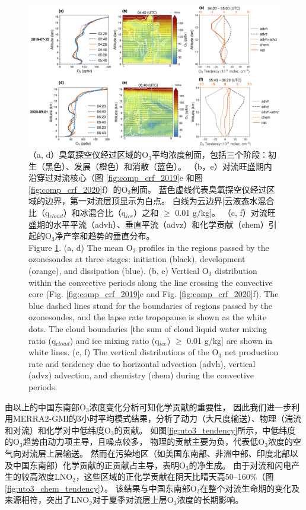 \begin{figure}[!htbp]
\centering
\includegraphics[width=\textwidth]{./figures/tendency_o3.png}
\caption{
（a, d）臭氧探空仪经过区域的O$_3$平均浓度剖面，包括三个阶段：初生（黑色）、发展（橙色）和消散（蓝色）。
（b，e）对流旺盛期内沿穿过对流核心（图 \ref{fig:comp_crf_2019}e 和图 \ref{fig:comp_crf_2020}f）的O$_3$剖面。
蓝色虚线代表臭氧探空仪经过区域的边界，第一对流层顶显示为白点。
白线为云边界[云液态水混合比（q$_{cloud}$）和冰混合比（q$_{ice}$）之和 $\geq$ 0.01 g/kg]。
（c, f）对流旺盛期的水平平流（advh）、垂直平流（advz）和化学贡献（chem）引起的O$_3$净产率和趋势的垂直分布。
\\
Figure \ref{fig:tendency_o3}. (a, d) The mean O$_3$ profiles in the regions passed by the ozonesondes
at three stages: initiation (black), development (orange), and dissipation (blue).
(b, e) Vertical O$_3$ distribution within the convective periods along the line crossing the convective core (Fig. \ref{fig:comp_crf_2019}e and Fig. \ref{fig:comp_crf_2020}f).
The blue dashed lines stand for the boundaries of regions passed by the ozonesondes, and the lapse rate tropopause is shown as the white dots.
The cloud boundaries [the sum of cloud liquid water mixing ratio (q$_{cloud}$) and ice mixing ratio (q$_{ice}$) $\geq$ 0.01 g/kg] are shown in white lines.
(c, f) The vertical distributions of the O$_3$ net production rate and tendency due to horizontal advection (advh), vertical (advz) advection, and chemistry (chem) during the convective periods.
}
\label{fig:tendency_o3}
\end{figure}


由以上的中国东南部O$_3$浓度变化分析可知化学贡献的重要性，
因此我们进一步利用MERRA2-GMI的3小时平均模式结果，分析了动力（大尺度输送）、物理（湍流和对流）和化学对中低纬度O$_3$的贡献。
如图\ref{fig:uto3_tendency}所示，中低纬度的O$_3$趋势由动力项主导，且噪点较多，
物理的贡献主要为负，代表低O$_3$浓度的空气向对流层上层输送。
然而在污染地区（如美国东南部、非洲中部、印度北部以及中国东南部）化学贡献的正贡献占主导，表明O$_3$的净生成。
由于对流和闪电产生的较高浓度LNO$_2$，这些区域的正化学贡献在阴天比晴天高50--160\%（图\ref{fig:uto3_chem_tendency}）。
该结果与中国东南部O$_3$在整个对流生命期的变化及来源相符，突出了LNO$_2$对于夏季对流层上层O$_3$浓度的长期影响。

